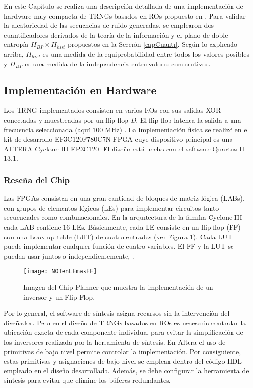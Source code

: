 En este Capítulo se realiza una descripción detallada de una implementación de hardware muy compacta de {TRNG}s basados en {RO}s propuesto en \cite{Wold2009}.
Para validar la aleatoriedad de las secuencias de ruido generadas, se emplearon dos cuantificadores derivados de la teoría de la información y el plano de doble entropía $H_{BP} \times H_{hist}$ propuestos en la Sección \ref{capCuanti}.
Según lo explicado arriba, $H_{hist}$ es una medida de la equiprobabilidad entre todos los valores posibles y $H_{BP}$ es una medida de la independencia entre valores consecutivos.

\subsection{Implementación en Hardware}

Los {TRNG} implementados consisten en varios {RO}s con sus salidas XOR conectadas y muestreadas por un flip-flop \emph{D}.
El flip-flop latchea la salida a una frecuencia seleccionada (aquí $ 100 $ MHz) \cite{Wold2009}.
La implementación física se realizó en el kit de desarrollo {EP3C120F780C7N} {FPGA} cuyo dispositivo principal es una  {ALTERA} {Cyclone} III {EP3C120}.
El diseño está hecho con el software {Quartus} II 13.1.

\subsubsection{Reseña del Chip}

Las {FPGA}s consisten en una gran cantidad de bloques de matriz lógica ({LAB}s), con grupos de elementos lógicos ({LE}s) para implementar circuitos tanto secuenciales como combinacionales.
En la arquitectura de la familia {Cyclone} III cada {LAB} contiene $16$ {LE}s.
Básicamente, cada {LE} consiste en un flip-flop ({FF}) con una Look up table ({LUT}) de cuatro entradas (ver Figura \ref{fig:LE}).
Cada {LUT} puede implementar cualquier función de cuatro variables.
El {FF} y la {LUT} se pueden usar juntos o independientemente, \cite{Altera}.
%
\begin{figure}
\begin{center}
\texttt{[image: NOTenLEmasFF]}
\caption{Imagen del Chip Planner que muestra la implementación de un inversor y un Flip Flop.} \label{fig:LE}
\end{center}
\end{figure}

Por lo general, el software de síntesis asigna recursos sin la intervención del diseñador.
Pero en el diseño de {TRNG}s basados en {RO}s es necesario controlar la ubicación exacta de cada componente individual  para evitar la simplificación de los inversores realizada por la herramienta de síntesis.
En {Altera} el uso de primitivas de bajo nivel permite controlar la implementación.
Por consiguiente, estas primitivas y asignaciones de bajo nivel se emplean dentro del código {HDL} empleado en el diseño desarrollado.
Además, se debe configurar la herramienta de síntesis para evitar que elimine los búferes redundantes.

